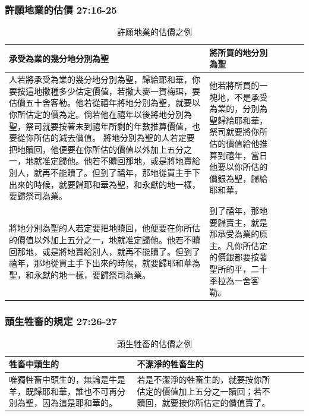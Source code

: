 \subsubsection{許願地業的估價 27:16-25}
\begin{table}[H]
\begin{threeparttable}
\begin{tabular}{@{}p{}*{4}{L{\tabcolsep\relax}}@{}}
\toprule
承受為業的幾分地分別為聖 & 將所買的地分別為聖 \\\hline
人若將承受為業的幾分地分別為聖，歸給耶和華，你要按這地撒種多少估定價值，若撒大麥一賀梅珥，要估價五十舍客勒。他若從禧年將地分別為聖，就要以你所估定的價為定。倘若他在禧年以後將地分別為聖，祭司就要按著未到禧年所剩的年數推算價值，也要從你所估的減去價值。
將地分別為聖的人若定要把地贖回，他便要在你所估的價值以外加上五分之一，地就准定歸他。他若不贖回那地，或是將地賣給別人，就再不能贖了。但到了禧年，那地從買主手下出來的時候，就要歸耶和華為聖，和永獻的地一樣，要歸祭司為業。
&他若將所買的一塊地，不是承受為業的，分別為聖歸給耶和華，祭司就要將你所估的價值給他推算到禧年，當日他要以你所估的價銀為聖，歸給耶和華。
\\\hline
將地分別為聖的人若定要把地贖回，他便要在你所估的價值以外加上五分之一，地就准定歸他。他若不贖回那地，或是將地賣給別人，就再不能贖了。但到了禧年，那地從買主手下出來的時候，就要歸耶和華為聖，和永獻的地一樣，要歸祭司為業。
&到了禧年，那地要歸賣主，就是那承受為業的原主。凡你所估定的價銀都要按著聖所的平，二十季拉為一舍客勒。\\\hline
\bottomrule
\end{tabular}
\caption{許願地業的估價之例}
\end{threeparttable}
\end{table} 

 
\subsubsection{頭生牲畜的規定 27:26-27}
\begin{table}[H]
\begin{threeparttable}
\begin{tabular}{@{}p{}*{4}{L{\tabcolsep\relax}}@{}}
\toprule
牲畜中頭生的 & 不潔淨的牲畜生的 \\\hline
唯獨牲畜中頭生的，無論是牛是羊，既歸耶和華，誰也不可再分別為聖，因為這是耶和華的。
&若是不潔淨的牲畜生的，就要按你所估定的價值加上五分之一贖回；若不贖回，就要按你所估定的價值賣了。\\\hline
\bottomrule
\end{tabular}
\caption{頭生牲畜的估價之例}
\end{threeparttable}
\end{table} 


